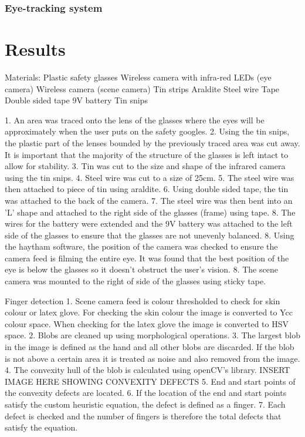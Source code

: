 \documentclass[jou,a4paper,notxfonts]{apa}
\begin{document}
\subsubsection{Eye-tracking system}
\section{Results}


Materials:
Plastic safety glasses
Wireless camera with infra-red LEDs (eye camera)
Wireless camera	(scene camera)
Tin strips
Araldite
Steel wire
Tape
Double sided tape
9V battery
Tin snips

1. An area was traced onto the lens of the glasses where the eyes will be approximately when the user puts on the safety googles. 
2. Using the tin snips, the plastic part of the lenses bounded by the previously traced area was cut away. It is important that the
majority of the structure of the glasses is left intact to allow for stability.
3. Tin was cut to the size and shape of the infrared camera using the tin snips.
4. Steel wire was cut to a size of 25cm.
5. The steel wire was then attached to piece of tin using araldite.
6. Using double sided tape, the tin was attached to the back of the camera.
7. The steel wire was then bent into an 'L' shape and attached to the right side of the glasses (frame) using tape.
8. The wires for the battery were extended and the 9V battery was attached to the left side of the glasses to ensure that the glasses
are not unevenly balanced.
8. Using the haytham software, the position of the camera was checked to ensure the camera feed is filming the entire eye.
It was found that the best position of the eye is below the glasses so it doesn't obstruct the user's vision. 
8. The scene camera was mounted to the right of side of the glasses using sticky tape.

Finger detection
1. Scene camera feed is colour thresholded to check for skin colour or latex glove. For checking the skin colour the image is 
converted to Ycc colour space. When checking for the latex glove the image is converted to HSV space.
2. Blobs are cleaned up using morphological operations.
3. The largest blob in the image is defined as the hand and all other blobs are discarded. If the blob is not above a certain area
it is treated as noise and also removed from the image.
4. The convexity hull of the blob is calculated using openCV's library.
INSERT IMAGE HERE SHOWING CONVEXITY DEFECTS
5. End and start points of the convexity defects are located.
6. If the location of the end and start points satisfy the custom heuristic equation, the defect is defined as a finger.
7. Each defect is checked and the number of fingers is therefore the total defects that satisfy the equation.
\end{document}
